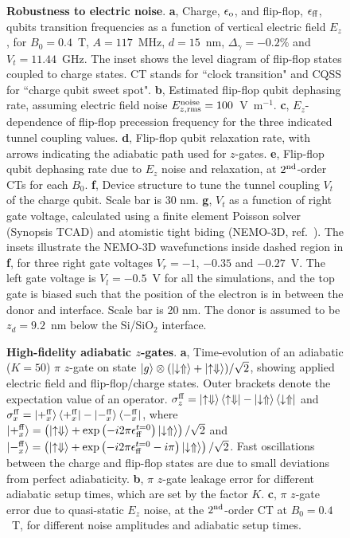 \documentclass[aps,prb,superscriptaddress,nobibnotes,preprint]{revtex4-1}%
\begin{document}
\begin{figure}
	\centering
	\caption{\textbf{Robustness to electric noise}.
		\textbf{a}, Charge, $\epsilon_{\rm o}$, and flip-flop, $\epsilon_{\rm ff}$, qubits transition frequencies as a function of vertical electric field $E_z$, for $B_0=0.4$~T, $A=117$~MHz, $d=15$~nm, $\Delta_\gamma=-0.2\%$ and $V_t=11.44$~GHz. The inset shows the level diagram of flip-flop states coupled to charge states. CT stands for ``clock transition" and CQSS for ``charge qubit sweet spot".
		\textbf{b}, Estimated flip-flop qubit dephasing rate, assuming electric field noise $E_{z, \rm rms}^{\rm noise}=100$~V~m$^{-1}$.
		\textbf{c}, $E_z$-dependence of flip-flop precession frequency for the three indicated tunnel coupling values.
		\textbf{d}, Flip-flop qubit relaxation rate, with arrows indicating the adiabatic path used for $z$-gates.
		\textbf{e}, Flip-flop qubit dephasing rate due to $E_z$ noise and relaxation, at $2^{\rm nd}$-order CTs for each $B_0$.
		\textbf{f}, Device structure to tune the tunnel coupling $V_t$ of the charge qubit. Scale bar is 30 nm. 
		\textbf{g}, $V_t$ as a function of right gate voltage, calculated using a finite element Poisson solver (Synopsis\textsuperscript{\textregistered} TCAD) and atomistic tight biding (NEMO-3D, ref.~). The insets illustrate the NEMO-3D wavefunctions inside dashed region in \textbf{f}, for three right gate voltages $V_r=-1$, $-0.35$ and $-0.27$~V. The left gate voltage is $V_l=-0.5$~V for all the simulations, and the top gate is biased such that the position of the electron is in between the donor and interface. Scale bar is 20 nm. The donor is assumed to be $z_d=9.2$~nm below the Si/SiO$_2$ interface.}
	\label{fig:clock}
\end{figure}\clearpage

\begin{figure}
	\centering
	\caption{\textbf{High-fidelity adiabatic $z$-gates}.
		\textbf{a}, Time-evolution of an adiabatic  ($K=50$) $\pi$ $z$-gate on state $\ket{g}\otimes(\ket{\downarrow\Uparrow}+\ket{\uparrow\Downarrow})/\sqrt{2}$, showing applied electric field and flip-flop/charge states. Outer brackets denote the expectation value of an operator. $\sigma_z^{\rm ff}=\ket{\uparrow\Downarrow}\bra{\uparrow\Downarrow}-\ket{\downarrow\Uparrow}\bra{\downarrow\Uparrow}$ and $\sigma_x^{\rm ff}=\ket{+_x^{\rm ff}}\bra{+_x^{\rm ff}}-\ket{-_x^{\rm ff}}\bra{-_x^{\rm ff}}$, where $\ket{+_x^{\rm ff}}=\left(\ket{\uparrow\Downarrow}+\exp{\left(-i2\pi\epsilon_{\rm ff}^{t=0}\right)}\ket{\downarrow\Uparrow}\right)/\sqrt{2}$ and $\ket{-_x^{\rm ff}}=\left(\ket{\uparrow\Downarrow}+\exp{\left(-i2\pi\epsilon_{\rm ff}^{t=0}-i\pi\right)}\ket{\downarrow\Uparrow}\right)/\sqrt{2}$. Fast oscillations between the charge and flip-flop states are due to small deviations from perfect adiabaticity.
		\textbf{b}, $\pi$ $z$-gate leakage error for different adiabatic setup times, which are set by the factor $K$.
		\textbf{c}, $\pi$ $z$-gate error due to quasi-static $E_z$ noise, at the $2^{\rm nd}$-order CT at $B_0=0.4$~T, for different noise amplitudes and adiabatic setup times.}
	\label{fig:z-gate}
\end{figure}\clearpage
\end{document}
